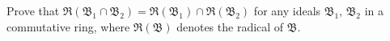 Prove that $\mathfrak{R}(\mathfrak{B}_1 \cap \mathfrak{B}_2) = \mathfrak{R}(\mathfrak{B}_1) \cap \mathfrak{R}(\mathfrak{B}_2)$ for any ideals $\mathfrak{B}_1$, $\mathfrak{B}_2$ in a commutative ring, where $\mathfrak{R}(\mathfrak{B})$ denotes the radical of $\mathfrak{B}$.
